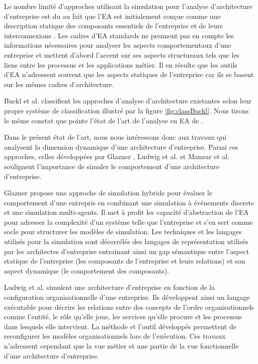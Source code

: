 Le nombre limité d'approches utilisant la simulation pour l'analyse
d'architecture d'entreprise est du au fait que l'EA est initialement conçue
comme une description statique des composants essentiels de l'entreprise et de
leurs interconnexions \cite{hoffman2013enterprise}. Les cadres d'EA standards
ne prennent pas en compte les informations nécessaires pour analyser les
aspects comportementaux d'une entreprise et mettent d'abord l'accent sur ses
aspects structuraux tels que les liens entre les processus et les applications
métier. Il en résulte que les outils d'EA n'adressent souvent que les aspects
statiques de l'entreprise car ils se basent sur les mêmes cadres d'architecture.

Buckl et al. \cite{buckl2009classifying} classifient les approches d'analyse d'architecture existantes selon leur propre système de classification illustré par la figure \ref{fig:classBuckl}. Nous tirons le même constat que pointe l'état de l'art de l'analyse en EA de \cite{manzur2015xarchimate}. 

Dans le présent état de l'art, nous nous intéressons donc aux travaux qui analysent la
dimension dynamique d'une architecture d'entreprise. Parmi ces approches,
celles développées par Glazner \cite{glazner2011enterprise},
Ludwig et al. \cite{ludwig2011organizational} et Manzur et al. \cite{manzur2015xarchimate} soulignent
l'importance de simuler le comportement d'une architecture d'entreprise. 

Glazner \cite{glazner2011enterprise} propose une approche de simulation hybride pour
évaluer le comportement d'une entrepris en combinant une simulation à
événements discrets et une simulation multi-agents.
Il met à profit les capacité d'abstraction de l'EA pour adresser la complexité d'un système telle que l'entreprise et s'en sert
comme socle pour structurer les modèles de simulation. Les
techniques et les langages utilisés pour la simulation sont décorrélés des
langages de représentation utilisés par les architectes d'entreprise entrainant
ainsi un gap sémantique entre l'aspect statique de l'entreprise (les composants
de l'entreprise et leurs relations) et son aspect dynamique (le comportement
des composants). 

Ludwig et al. \cite{ludwig2011organizational} simulent une architecture d'entreprise en
fonction de la configuration organisationnelle d'une entreprise. Ils
développent ainsi un langage exécutable pour décrire les relations entre des
concepts de l'ordre organisationnels comme l'entité, le rôle
qu'elle joue, les services qu'elle procure et les processus dans lesquels elle
intervient. La méthode et l'outil développés permettent de reconfigurer les
modèles organisationnels lors de l'exécution. Ces travaux n'adressent cependant
que la vue métier et une partie de la vue fonctionnelle d'une architecture
d'entreprise.

